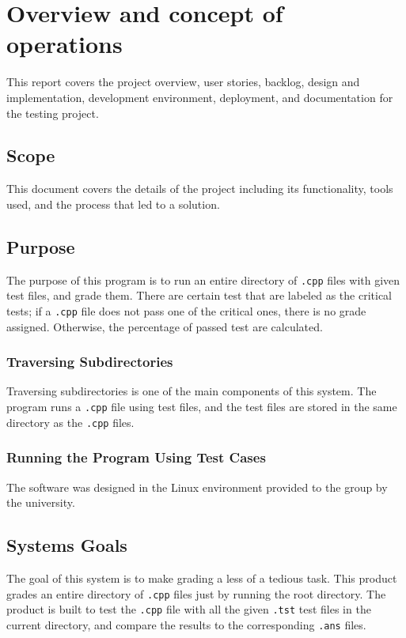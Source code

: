 
\chapter{Overview and concept of operations}

This report covers the project overview, user stories, backlog, design and implementation, development environment, deployment, and documentation for the testing project. 


\section{Scope}
This document covers the details of the project including its functionality, tools used, and the process that led to a solution.


\section{Purpose}
The purpose of this program is to run an entire directory of {\tt .cpp} files with given test files, and grade them. There are certain test that are labeled as the critical tests; if a {\tt .cpp} file does not pass one of the critical ones, there is no grade assigned. Otherwise, the percentage of passed test are calculated. 


\subsection{Traversing Subdirectories}
Traversing subdirectories is one of the main components of this system. The program runs a {\tt .cpp} file using test files, and the test files are stored in the same directory as the {\tt .cpp} files.  

\subsection{Running the Program Using Test Cases}
The software was designed in the Linux environment provided to the group by the university. 
 
\section{Systems Goals}
The goal of this system is to make grading a less of a tedious task. This product grades an entire directory of {\tt .cpp} files just by running the root directory. The product is built to test the {\tt .cpp} file with all the given {\tt .tst} test files in the current directory, and compare the results to the corresponding {\tt .ans} files.  

